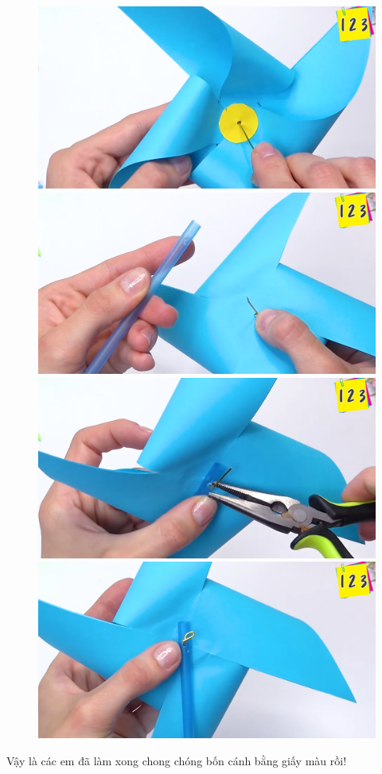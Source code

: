 \begin{multicols}{2}
\begin{figure}[H]
		\vspace*{5pt}
		\centering
		\captionsetup{labelformat= empty, justification=centering}
		\includegraphics[width= 0.75\linewidth]{10a}
		\includegraphics[width= 0.75\linewidth]{10b}
		\includegraphics[width= 0.75\linewidth]{10c}
		\includegraphics[width= 0.75\linewidth]{10d}
		\vspace*{-10pt}
	\end{figure}
	Vậy là các em đã làm xong chong chóng bốn cánh bằng giấy màu rồi!

\end{multicols}
